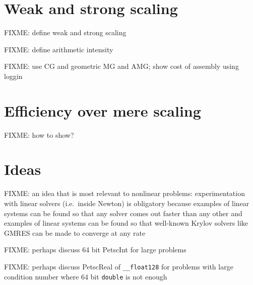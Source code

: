 
\section{Weak and strong scaling}

FIXME: define weak and strong scaling

FIXME: define arithmetic intensity

FIXME: use CG and geometric MG and AMG; show cost of assembly using loggin

\section{Efficiency over mere scaling}

FIXME: how to show?

\section{Ideas}

FIXME: an idea that is most relevant to nonlinear problems: experimentation with linear solvers (i.e.~inside Newton) is obligatory because examples of linear systems can be found so that any solver comes out faster than any other \citep{Nachtigaletal1992} and examples of linear systems can be found so that well-known Krylov solvers like GMRES can be made to converge at any rate \citep{Greenbaumetal1996}

FIXME: perhaps discuss 64 bit PetscInt for large problems

FIXME: perhaps discuss PetscReal of \verb|__float128| for problems with large condition number where 64 bit \texttt{double} is not enough